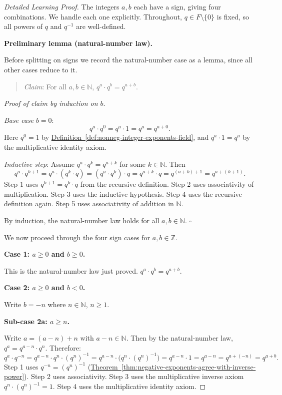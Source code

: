 \begin{proof}[Detailed Learning Proof]
\LRAProofBodyStart

The integers $a,b$ each have a sign, giving four combinations.  We handle
each one explicitly.  Throughout, $q\in F\setminus\{0\}$ is fixed, so all
powers of $q$ and $q^{-1}$ are well-defined.

\textbf{Preliminary lemma (natural-number law).}

Before splitting on signs we record the natural-number case as a lemma, since
all other cases reduce to it.

\begin{quote}
\textit{Claim}: For all $a,b\in\mathbb{N}$, $q^a\cdot q^b = q^{a+b}$.
\end{quote}

\textit{Proof of claim by induction on $b$}.

\textit{Base case} $b=0$:
\[
q^a\cdot q^0 = q^a\cdot 1 = q^a = q^{a+0}.
\]
Here $q^0 = 1$ by \hyperref[def:nonneg-integer-exponents-field]{Definition~\ref*{def:nonneg-integer-exponents-field}},
and $q^a\cdot 1 = q^a$ by the multiplicative identity axiom.

\textit{Inductive step}: Assume $q^a\cdot q^k = q^{a+k}$ for some $k\in\mathbb{N}$.
Then
\[
q^a\cdot q^{k+1}
= q^a\cdot(q^k\cdot q)
= (q^a\cdot q^k)\cdot q
= q^{a+k}\cdot q
= q^{(a+k)+1}
= q^{a+(k+1)}.
\]
Step 1 uses $q^{k+1} = q^k\cdot q$ from the recursive definition.
Step 2 uses associativity of multiplication.
Step 3 uses the inductive hypothesis.
Step 4 uses the recursive definition again.
Step 5 uses associativity of addition in $\mathbb{N}$.

By induction, the natural-number law holds for all $a,b\in\mathbb{N}$.
$\square$

\medskip

We now proceed through the four sign cases for $a,b\in\mathbb{Z}$.

\medskip

\textbf{Case 1: $a\geq 0$ and $b\geq 0$.}

This is the natural-number law just proved.  $q^a\cdot q^b = q^{a+b}$.

\medskip

\textbf{Case 2: $a\geq 0$ and $b < 0$.}

Write $b = -n$ where $n\in\mathbb{N}$, $n\geq 1$.

\textbf{Sub-case 2a: $a\geq n$.}

Write $a = (a-n) + n$ with $a-n\in\mathbb{N}$.  Then by the natural-number law,
$q^a = q^{a-n}\cdot q^n$.  Therefore:
\[
q^a\cdot q^{-n}
= q^{a-n}\cdot q^n\cdot(q^n)^{-1}
= q^{a-n}\cdot\bigl(q^n\cdot(q^n)^{-1}\bigr)
= q^{a-n}\cdot 1
= q^{a-n}
= q^{a+(-n)}
= q^{a+b}.
\]
Step 1 uses $q^{-n} = (q^n)^{-1}$
(\hyperref[thm:negative-exponents-agree-with-inverse-power]{Theorem~\ref*{thm:negative-exponents-agree-with-inverse-power}}).
Step 2 uses associativity.
Step 3 uses the multiplicative inverse axiom $q^n\cdot(q^n)^{-1} = 1$.
Step 4 uses the multiplicative identity axiom.


\end{proof}
